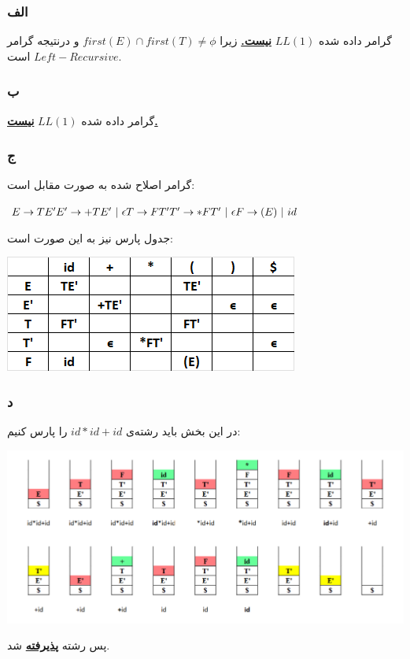 \subsubsection*{الف}
گرامر داده شده 
$LL(1)$
\textbf{\underline{نیست.}}
زیرا 
$first(E)\cap first(T) \neq \phi$
و درنتیجه گرامر 
$Left-Recursive$
است.

\subsubsection*{ب}
گرامر داده شده 
$LL(1)$
\textbf{\underline{نیست.}}

\subsubsection*{ج}
گرامر اصلاح شده به صورت مقابل است:

\setLTR
$
E \rightarrow TE' \\ 
E' \rightarrow +TE' \ | \ \epsilon \\
T \rightarrow FT' \\
T' \rightarrow *FT' \ | \ \epsilon \\
F \rightarrow (E) \ | \ id
$
\setRTL

جدول پارس نیز به این صورت است:

\qquad\qquad\qquad\qquad\qquad\includegraphics[width=0.5\linewidth]{figs/3.png}

\subsubsection*{د}

در این بخش باید رشته‌ی 
$id *id+id$
را پارس کنیم:

\qquad\qquad\qquad\qquad\qquad\includegraphics[width=1\linewidth]{figs/4.png}

پس رشته 
\textbf{\underline{پذیرفته}}
 شد.
